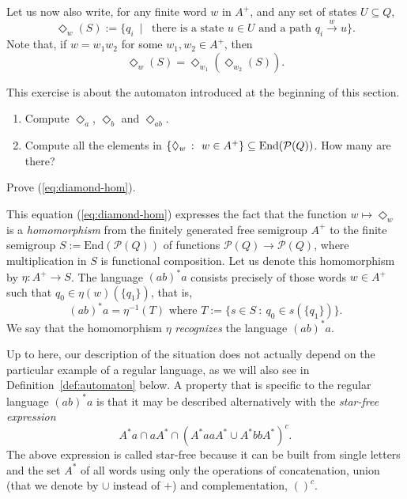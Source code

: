 Let us now also write, for any finite word $w$ in $A^+$, and any set of states $U \subseteq Q$,
\[ \Diamond_w(S) := \{ q_i \ \mid \ \text{ there is a state } u \in U \text{ and a path } q_i \stackrel{w}{\to} u \}.\]
Note that, if $w = w_1w_2$ for some $w_1, w_2 \in A^+$, then
\begin{equation}\label{eq:diamond-hom}
\Diamond_w(S) = \Diamond_{w_1} (\Diamond_{w_2}(S)).
\end{equation}

\begin{exercise}\label{exe:diamond}
  This exercise is about the automaton introduced at the beginning of this section.
  \begin{enumerate}
\item \easy Compute $\Diamond_a$, $\Diamond_b$ and $\Diamond_{ab}$.
\item \medium Compute all the elements in $\{ \Diamond_w \ \colon \ w \in A^+\} \subseteq \mathrm{End}(\mathcal{P}(Q))$. How many are there?
  \end{enumerate}
\end{exercise}
\begin{exercise}\easy
 Prove (\ref{eq:diamond-hom}).
\end{exercise}

This equation (\ref{eq:diamond-hom}) expresses the fact that the function $w \mapsto \Diamond_w$ is a \emph{homomorphism} from the finitely generated free semigroup $A^+$ to the finite semigroup $S := \mathrm{End}(\mathcal{P}(Q))$ of functions $\mathcal{P}(Q) \to \mathcal{P}(Q)$, where multiplication in $S$ is functional composition. Let us denote this homomorphism by $\eta \colon A^+ \to S$. The language $(ab)^*a$ consists precisely of those words $w \in A^+$ such that $q_0 \in \eta(w)(\{q_1\})$, that is,
\[ (ab)^*a = \eta^{-1}(T) \text{ where } T := \{s \in S \ \colon \ q_0 \in s(\{q_1\})\}.\]
We say that the homomorphism $\eta$ \emph{recognizes} the language $(ab)^*a$. 

Up to here, our description of the situation does not actually  depend on the particular example of a regular language, as we will also see in Definition~\ref{def:automaton} below. A property that is specific to the regular language $(ab)^*a$ is that it may be described alternatively with the \emph{star-free expression}
\[  A^*a \cap aA^* \cap (A^*aaA^* \cup A^*bbA^*)^c.\]
The above expression is called star-free because it can be built from  single letters and the set $A^*$ of all words using only the operations of concatenation, union (that we denote by $\cup$ instead of $+$) and complementation, $()^c$.%
%

